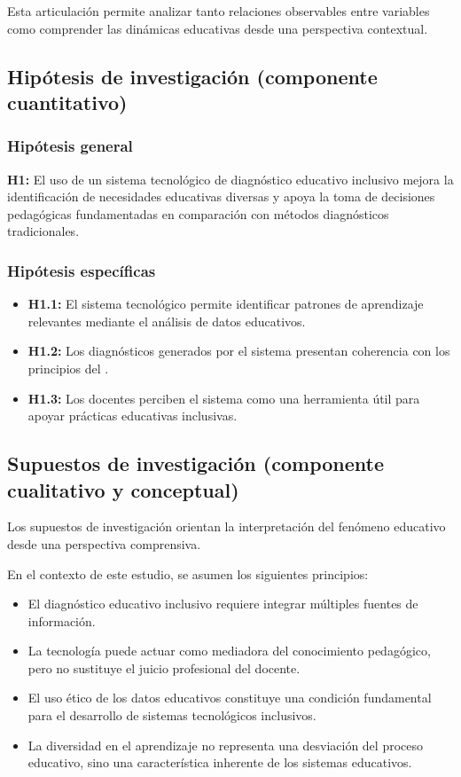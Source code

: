 \begin{refsection}
Esta articulación permite analizar tanto relaciones observables entre variables como comprender las dinámicas educativas desde una perspectiva contextual.

\subsection{Hipótesis de investigación (componente cuantitativo)}

\subsubsection{Hipótesis general}

\textbf{H1:} El uso de un sistema tecnológico de diagnóstico educativo inclusivo mejora la identificación de necesidades educativas diversas y apoya la toma de decisiones pedagógicas fundamentadas en comparación con métodos diagnósticos tradicionales.

\subsubsection{Hipótesis específicas}

\begin{itemize}
\item \textbf{H1.1:} El sistema tecnológico permite identificar patrones de aprendizaje relevantes mediante el análisis de datos educativos.
\item \textbf{H1.2:} Los diagnósticos generados por el sistema presentan coherencia con los principios del \DUA.
\item \textbf{H1.3:} Los docentes perciben el sistema como una herramienta útil para apoyar prácticas educativas inclusivas.
\end{itemize}

\subsection{Supuestos de investigación (componente cualitativo y conceptual)}

Los supuestos de investigación orientan la interpretación del fenómeno educativo desde una perspectiva comprensiva.

En el contexto de este estudio, se asumen los siguientes principios:

\begin{itemize}
\item El diagnóstico educativo inclusivo requiere integrar múltiples fuentes de información.
\item La tecnología puede actuar como mediadora del conocimiento pedagógico, pero no sustituye el juicio profesional del docente.
\item El uso ético de los datos educativos constituye una condición fundamental para el desarrollo de sistemas tecnológicos inclusivos.
\item La diversidad en el aprendizaje no representa una desviación del proceso educativo, sino una característica inherente de los sistemas educativos.
\end{itemize}


\end{refsection}
